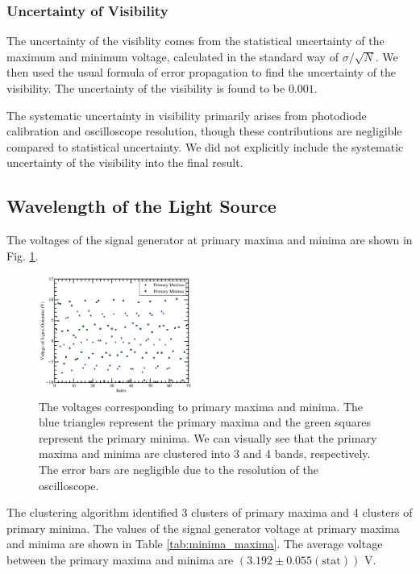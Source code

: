 \subsubsection{Uncertainty of Visibility}
The uncertainty of the visiblity comes from the statistical uncertainty of the maximum and minimum voltage, calculated in the standard way of $\sigma/\sqrt{N}$. We then used the usual formula of error propagation to find the uncertainty of the visibility. The uncertainty of the visibility is found to be $0.001$. 

The systematic uncertainty in visibility primarily arises from photodiode calibration and oscilloscope resolution, though these contributions are negligible compared to statistical uncertainty. We did not explicitly include the systematic uncertainty of the visibility into the final result.

\subsection{Wavelength of the Light Source}
The voltages of the signal generator at primary maxima and minima are shown in Fig. \ref{fig:data}. 
\begin{figure}[h]
    \centering
    \includegraphics[width=0.45\textwidth]{fig/Primary_Maxima_Minima.png}
    \caption{The voltages corresponding to primary maxima and minima. The blue triangles represent the primary maxima and the green squares represent the primary minima. We can visually see that the primary maxima and minima are clustered into 3 and 4 bands, respectively. The error bars are negligible due to the resolution of the oscilloscope.}
    \label{fig:data}
\end{figure}

The clustering algorithm identified 3 clusters of primary maxima and 4 clusters of primary minima. The values of the signal generator voltage at primary maxima and minima are shown in Table \ref{tab:minima_maxima}. The average voltage between the primary maxima and minima are $(3.192 \pm 0.055 (\text{stat})) \text{ V}$. 

